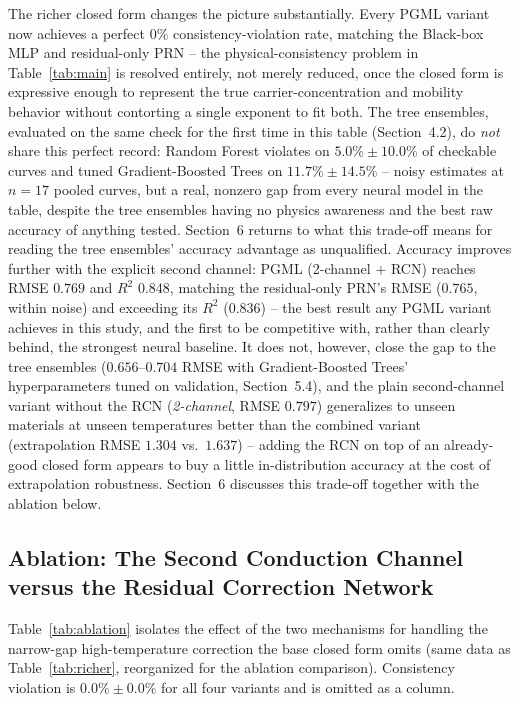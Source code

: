 \documentclass[11pt]{article}
\begin{document}
The richer closed form changes the picture substantially. Every PGML variant now achieves a perfect $0\%$ consistency-violation rate, matching the Black-box MLP and residual-only PRN -- the physical-consistency problem in Table~\ref{tab:main} is resolved entirely, not merely reduced, once the closed form is expressive enough to represent the true carrier-concentration and mobility behavior without contorting a single exponent to fit both. The tree ensembles, evaluated on the same check for the first time in this table (Section~4.2), do \emph{not} share this perfect record: Random Forest violates on $5.0\% \pm 10.0\%$ of checkable curves and tuned Gradient-Boosted Trees on $11.7\% \pm 14.5\%$ -- noisy estimates at $n=17$ pooled curves, but a real, nonzero gap from every neural model in the table, despite the tree ensembles having no physics awareness and the best raw accuracy of anything tested. Section~6 returns to what this trade-off means for reading the tree ensembles' accuracy advantage as unqualified. Accuracy improves further with the explicit second channel: PGML (2-channel + RCN) reaches RMSE $0.769$ and $R^2$ $0.848$, matching the residual-only PRN's RMSE ($0.765$, within noise) and exceeding its $R^2$ ($0.836$) -- the best result any PGML variant achieves in this study, and the first to be competitive with, rather than clearly behind, the strongest neural baseline. It does not, however, close the gap to the tree ensembles ($0.656$--$0.704$ RMSE with Gradient-Boosted Trees' hyperparameters tuned on validation, Section~5.4), and the plain second-channel variant without the RCN (\emph{2-channel}, RMSE $0.797$) generalizes to unseen materials at unseen temperatures better than the combined variant (extrapolation RMSE $1.304$ vs.\ $1.637$) -- adding the RCN on top of an already-good closed form appears to buy a little in-distribution accuracy at the cost of extrapolation robustness. Section~6 discusses this trade-off together with the ablation below.

\subsection{Ablation: The Second Conduction Channel versus the Residual Correction Network}

Table~\ref{tab:ablation} isolates the effect of the two mechanisms for handling the narrow-gap high-temperature correction the base closed form omits (same data as Table~\ref{tab:richer}, reorganized for the ablation comparison). Consistency violation is $0.0\% \pm 0.0\%$ for all four variants and is omitted as a column.
\end{document}
